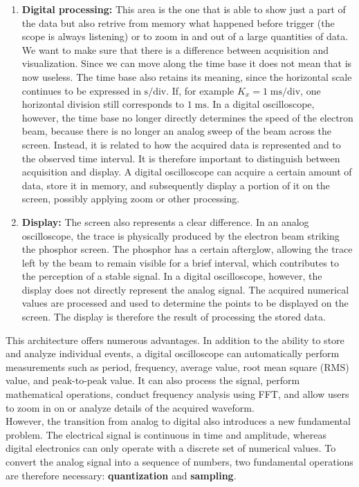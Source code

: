 \documentclass[../main.tex]{subfiles}
\begin{document}
\begin{enumerate}[label=\textbf{-}]
	\item \textbf{Digital processing:} This area is the one that is able to show just a part of the data but also retrive from memory what happened before trigger (the scope is always listening) or to zoom in and out of a large quantities of data. We want to make sure that there is a difference between acquisition and visualization. Since we can move along the time base it does not mean that is now useless. The time base also retains its meaning, since the horizontal scale continues to be expressed in $\mathrm{s/div}$. If, for example $K_x=1 \; \mathrm{ms/div}$, one horizontal division still corresponds to $1 \; \mathrm{ms}$. In a digital oscilloscope, however, the time base no longer directly determines the speed of the electron beam, because there is no longer an analog sweep of the beam across the screen. Instead, it is related to how the acquired data is represented and to the observed time interval. It is therefore important to distinguish between acquisition and display. A digital oscilloscope can acquire a certain amount of data, store it in memory, and subsequently display a portion of it on the screen, possibly applying zoom or other processing.
	
	\item \textbf{Display:} The screen also represents a clear difference. In an analog oscilloscope, the trace is physically produced by the electron beam striking the phosphor screen. The phosphor has a certain afterglow, allowing the trace left by the beam to remain visible for a brief interval, which contributes to the perception of a stable signal. In a digital oscilloscope, however, the display does not directly represent the analog signal. The acquired numerical values are processed and used to determine the points to be displayed on the screen. The display is therefore the result of processing the stored data.
\end{enumerate}

This architecture offers numerous advantages. In addition to the ability to store and analyze individual events, a digital oscilloscope can automatically perform measurements such as period, frequency, average value, root mean square (RMS) value, and peak-to-peak value. It can also process the signal, perform mathematical operations, conduct frequency analysis using FFT, and allow users to zoom in on or analyze details of the acquired waveform.\\

However, the transition from analog to digital also introduces a new fundamental problem. The electrical signal is continuous in time and amplitude, whereas digital electronics can only operate with a discrete set of numerical values. To convert the analog signal into a sequence of numbers, two fundamental operations are therefore necessary: \textbf{quantization} and \textbf{sampling}.
\end{document}
